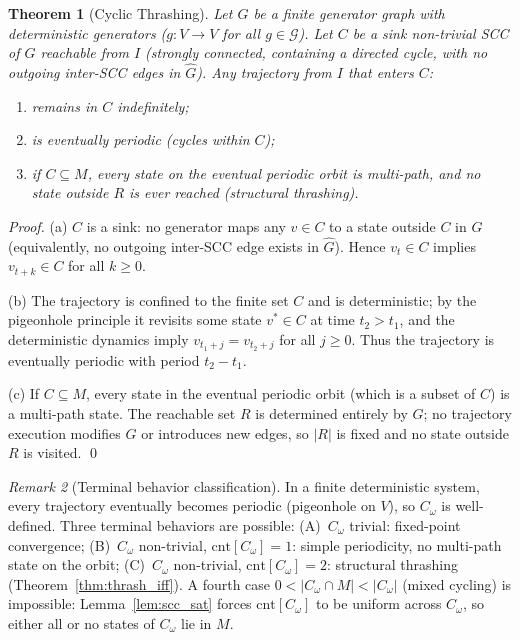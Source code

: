 \documentclass[11pt,letterpaper]{article}
\theoremstyle{plain}
\newtheorem{theorem}{Theorem}
\theoremstyle{definition}
\theoremstyle{remark}
\newtheorem{remark}[theorem]{Remark}
\newcommand{\gens}{\mathcal{G}}
\newcommand{\Ghat}{\hat{G}}
\begin{document}
\begin{theorem}[Cyclic Thrashing]
  \label{thm:thrash}
  Let $G$ be a finite generator graph with deterministic generators
  ($g: V \to V$ for all $g \in \gens$).
  Let $C$ be a sink non-trivial SCC of $G$ reachable from $I$
  (strongly connected, containing a directed cycle,
  with no outgoing inter-SCC edges in $\Ghat$).
  Any trajectory from $I$ that enters $C$:
  \begin{enumerate}
    \item[(a)] remains in $C$ indefinitely;
    \item[(b)] is eventually periodic (cycles within $C$);
    \item[(c)] if $C \subseteq M$, every state on the eventual periodic
      orbit is multi-path, and no state outside $R$ is ever reached
      (\emph{structural thrashing}).
  \end{enumerate}
\end{theorem}
\begin{proof}
  (a) $C$ is a sink: no generator maps any $v \in C$ to a state outside
  $C$ in $G$ (equivalently, no outgoing inter-SCC edge exists in $\Ghat$).
  Hence $v_t \in C$ implies $v_{t+k} \in C$ for all $k \geq 0$.

  (b) The trajectory is confined to the finite set $C$ and is
  deterministic; by the pigeonhole principle it revisits some state
  $v^* \in C$ at time $t_2 > t_1$, and the deterministic dynamics
  imply $v_{t_1 + j} = v_{t_2 + j}$ for all $j \geq 0$.
  Thus the trajectory is eventually periodic with period $t_2 - t_1$.

  (c) If $C \subseteq M$, every state in the eventual periodic orbit
  (which is a subset of $C$) is a multi-path state.
  The reachable set $R$ is determined entirely by $G$; no trajectory
  execution modifies $G$ or introduces new edges, so $|R|$ is fixed
  and no state outside $R$ is visited. \qed
\end{proof}

\begin{remark}[Terminal behavior classification]
  \label{rem:terminal}
  In a finite deterministic system, every trajectory eventually becomes
  periodic (pigeonhole on $V$), so $C_\omega$ is well-defined.
  Three terminal behaviors are possible:
  (A)~$C_\omega$ trivial: fixed-point convergence;
  (B)~$C_\omega$ non-trivial, $\mathrm{cnt}[C_\omega] = 1$: simple
  periodicity, no multi-path state on the orbit;
  (C)~$C_\omega$ non-trivial, $\mathrm{cnt}[C_\omega] = 2$: structural
  thrashing (Theorem~\ref{thm:thrash_iff}).
  A fourth case $0 < |C_\omega \cap M| < |C_\omega|$ (mixed cycling)
  is impossible: Lemma~\ref{lem:scc_sat} forces $\mathrm{cnt}[C_\omega]$
  to be uniform across $C_\omega$, so either all or no states of $C_\omega$
  lie in $M$.
\end{remark}
\end{document}
